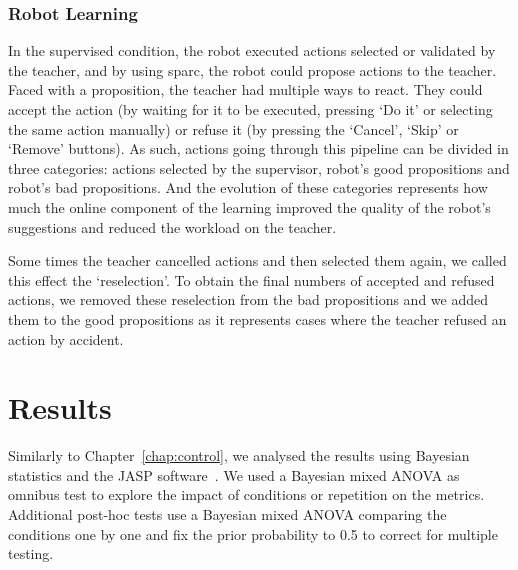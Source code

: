 
\subsubsection{Robot Learning}

In the supervised condition, the robot executed actions selected or validated by the teacher, and by using \gls{sparc}, the robot could propose actions to the teacher. Faced with a proposition, the teacher had multiple ways to react. They could accept the action (by waiting for it to be executed, pressing `Do it' or selecting the same action manually) or refuse it (by pressing the `Cancel', `Skip' or `Remove' buttons). As such, actions going through this pipeline can be divided in three categories: actions selected by the supervisor, robot's good propositions and robot's bad propositions. And the evolution of these categories represents how much the online component of the learning improved the quality of the robot's suggestions and reduced the workload on the teacher. 

Some times the teacher cancelled actions and then selected them again, we called this effect the `reselection'. To obtain the final numbers of accepted and refused actions, we removed these reselection from the bad propositions and we added them to the good propositions as it represents cases where the teacher refused an action by accident.

\section{Results}



Similarly to Chapter~\ref{chap:control}, we analysed the results using Bayesian statistics and the JASP software~\citep{jasp2018}. We used a Bayesian mixed ANOVA as omnibus test to explore the impact of conditions or repetition on the metrics. Additional post-hoc tests use a Bayesian mixed ANOVA comparing the conditions one by one and fix the prior probability to 0.5  to correct for multiple testing.

